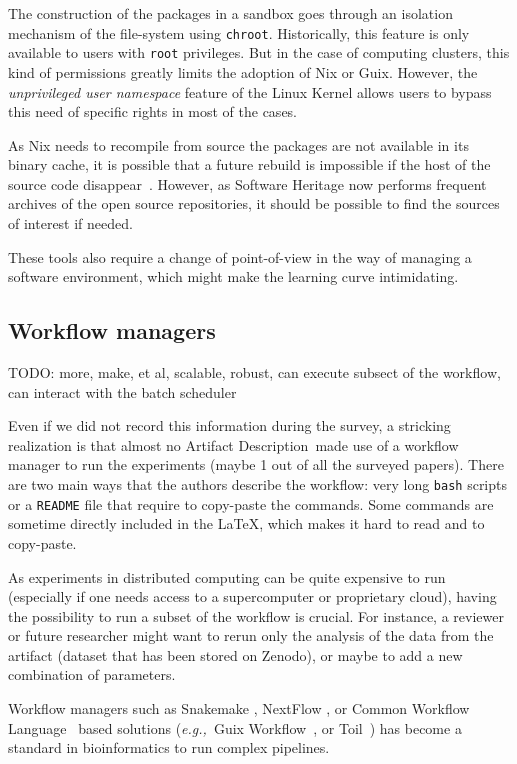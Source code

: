 \documentclass[sigconf,natbib=false]{acmart}
\newcommand{\eg}{\emph{e.g.,}}
\newcommand{\ad}{Artifact Description}
\newcommand{\todo}[1]{{\color{red}TODO: #1}}
\begin{document}
The construction of the packages in a sandbox goes through an isolation mechanism of the file-system using \texttt{chroot}.
Historically, this feature is only available to users with \texttt{root} privileges.
But in the case of computing clusters, this kind of permissions greatly limits the adoption of Nix or Guix.
However, the \emph{unprivileged user namespace} feature of the Linux Kernel allows users to bypass this need of specific rights in most of the cases.

As Nix needs to recompile from source the packages are not available in its binary cache, it is possible that a future rebuild is impossible if the host of the source code disappear\ \cite{blinry}.
However, as Software Heritage now performs frequent archives of the open source repositories, it should be possible to find the sources of interest if needed.

These tools also require a change of point-of-view in the way of managing a software environment, which might make the learning curve intimidating.


\subsection{Workflow managers}\label{sec:sop:workflow}

\todo{more, make, et al, scalable, robust, can execute subsect of the workflow, can interact with the batch scheduler\ \cite{snakemake-executor-plugin-slurm}}

Even if we did not record this information during the survey, a stricking realization is that almost no \ad\ made use of a workflow manager to run the experiments (maybe 1 out of all the  surveyed papers).
There are two main ways that the authors describe the workflow: very long \texttt{bash} scripts or a \texttt{README} file that require to copy-paste the commands.
Some commands are sometime directly included in the LaTeX, which makes it hard to read and to copy-paste.

As experiments in distributed computing can be quite expensive to run (especially if one needs access to a supercomputer or proprietary cloud), having the possibility to run a subset of the workflow is crucial.
For instance, a reviewer or future researcher might want to rerun only the analysis of the data from the artifact (dataset that has been stored on Zenodo), or maybe to add a new combination of parameters. 

Workflow managers \cite{wratten2021reproducible} such as Snakemake \cite{koster2012snakemake}, NextFlow \cite{di2017nextflow}, or Common Workflow Language\ \cite{amstutz2016common} based solutions (\eg\ Guix Workflow\ \cite{strozzi2019scalable}, or Toil\ \cite{vivian2017toil}) has become a standard in bioinformatics to run complex pipelines.
\end{document}

